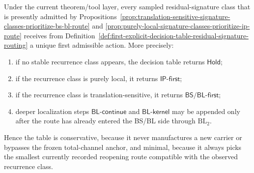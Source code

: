 \begin{proposition}
\label{prop:first-explicit-decision-table-conservative-and-minimal}
Under the current theorem/tool layer, every sampled residual-signature class that is presently admitted by Propositions~\ref{prop:translation-sensitive-signature-classes-prioritize-bs-bl-route} and \ref{prop:purely-local-signature-classes-prioritize-ip-route} receives from Definition~\ref{def:first-explicit-decision-table-residual-signature-routing} a unique first admissible action. More precisely:
\begin{enumerate}[label=(\roman*)]
    \item if no stable recurrence class appears, the decision table returns \(\mathsf{Hold}\);
    \item if the recurrence class is purely local, it returns \(\mathsf{IP\text{-}first}\);
    \item if the recurrence class is translation-sensitive, it returns \(\mathsf{BS/BL\text{-}first}\);
    \item deeper localization steps \(\mathsf{BL\text{-}continue}\) and \(\mathsf{BL\text{-}kernel}\) may be appended only after the route has already entered the BS/BL side through \(\mathrm{BL}_2\).
\end{enumerate}
Hence the table is conservative, because it never manufactures a new carrier or bypasses the frozen total-channel anchor, and minimal, because it always picks the smallest currently recorded reopening route compatible with the observed recurrence class.
\end{proposition}

